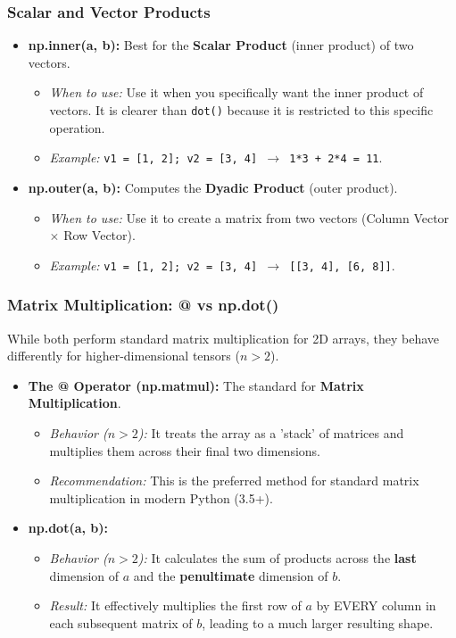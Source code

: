 \subsubsection{Scalar and Vector Products}
\begin{itemize}
    \item \textbf{np.inner(a, b):} Best for the \textbf{Scalar Product} (inner product) of two vectors. 
    \begin{itemize}
        \item \textit{When to use:} Use it when you specifically want the inner product of vectors. It is clearer than \texttt{dot()} because it is restricted to this specific operation.
        \item \textit{Example:} \texttt{v1 = [1, 2]; v2 = [3, 4] $\to$ 1*3 + 2*4 = 11}.
    \end{itemize}
    
    \item \textbf{np.outer(a, b):} Computes the \textbf{Dyadic Product} (outer product).
    \begin{itemize}
        \item \textit{When to use:} Use it to create a matrix from two vectors (Column Vector $\times$ Row Vector).
        \item \textit{Example:} \texttt{v1 = [1, 2]; v2 = [3, 4] $\to$ [[3, 4], [6, 8]]}.
    \end{itemize}
\end{itemize}

\subsubsection{Matrix Multiplication: @ vs np.dot()}
While both perform standard matrix multiplication for 2D arrays, they behave differently for higher-dimensional tensors ($n > 2$).

\begin{itemize}
    \item \textbf{The @ Operator (np.matmul):} The standard for \textbf{Matrix Multiplication}.
    \begin{itemize}
        \item \textit{Behavior ($n > 2$):} It treats the array as a 'stack' of matrices and multiplies them across their final two dimensions.
        \item \textit{Recommendation:} This is the preferred method for standard matrix multiplication in modern Python (3.5+).
    \end{itemize}
    
    \item \textbf{np.dot(a, b):}
    \begin{itemize}
        \item \textit{Behavior ($n > 2$):} It calculates the sum of products across the \textbf{last} dimension of $a$ and the \textbf{penultimate} dimension of $b$.
        \item \textit{Result:} It effectively multiplies the first row of $a$ by EVERY column in each subsequent matrix of $b$, leading to a much larger resulting shape.
    \end{itemize}
\end{itemize}


